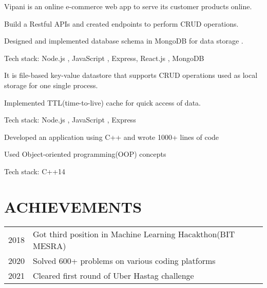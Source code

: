 \documentclass[]{deedy-resume-openfont}
\begin{document}
\begin{minipage}[t]{0.66\textwidth}

Vipani is an online e-commerce web app to serve its customer products online.
\begin{tightemize}
\item Build a Restful APIs and created endpoints to perform CRUD operations.
\item Designed and implemented database schema in MongoDB for data storage .
\item Tech stack: Node.js , JavaScript , Express, React.js , MongoDB
\end{tightemize}
\sectionsep



\begin{tightemize}
\item It is file-based key-value datastore that supports CRUD operations used as
local storage for one single process.
\item Implemented TTL(time-to-live) cache for quick access of data.
\item Tech stack: Node.js , JavaScript , Express
\end{tightemize}
\sectionsep





\begin{tightemize}
\item  Developed an application using C++ and wrote 1000+ lines of code
\item  Used Object-oriented programming(OOP) concepts 
\item  Tech stack: C++14 
\end{tightemize}
\sectionsep



\section{ACHIEVEMENTS} 
\begin{tabular}{rll}
2018	    & Got third position in Machine Learning Hacakthon(BIT MESRA)\\
2020        & Solved 600+ problems on various coding platforms\\
2021        & Cleared first round of Uber Hastag challenge
\end{tabular}
\sectionsep



\end{minipage} 
\end{document}
